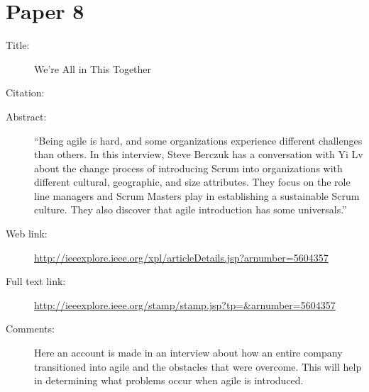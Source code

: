 \documentclass{scrartcl}
\begin{document}
\section*{Paper 8}
\begin{description}
	\item[Title:] We're All in This Together 
	\item[Citation:] \cite{Together}
	\item[Abstract:] ``Being agile is hard, and some organizations experience different challenges than others. In this interview, Steve Berczuk has a conversation with Yi Lv about the change process of introducing Scrum into organizations with different cultural, geographic, and size attributes. They focus on the role line managers and Scrum Masters play in establishing a sustainable Scrum culture. They also discover that agile introduction has some universals.''
	\item[Web link:] \url{http://ieeexplore.ieee.org/xpl/articleDetails.jsp?arnumber=5604357}
	\item[Full text link:] \url{http://ieeexplore.ieee.org/stamp/stamp.jsp?tp=&arnumber=5604357}
	\item[Comments:] Here an account is made in an interview about how an entire company transitioned into agile and the obstacles that were overcome. This will help in determining what problems occur when agile is introduced.
\end{description}
\end{document}
